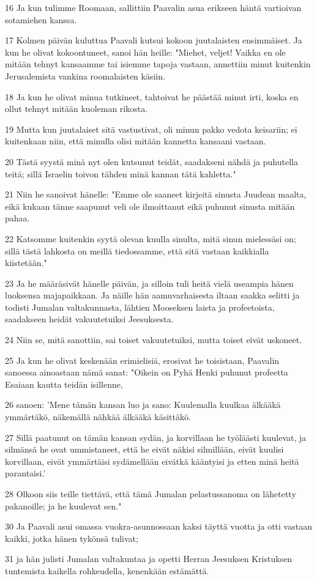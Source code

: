 \par 16 Ja kun tulimme Roomaan, sallittiin Paavalin asua erikseen häntä vartioivan sotamiehen kanssa.
\par 17 Kolmen päivän kuluttua Paavali kutsui kokoon juutalaisten ensimmäiset. Ja kun he olivat kokoontuneet, sanoi hän heille: "Miehet, veljet! Vaikka en ole mitään tehnyt kansaamme tai isiemme tapoja vastaan, annettiin minut kuitenkin Jerusalemista vankina roomalaisten käsiin.
\par 18 Ja kun he olivat minua tutkineet, tahtoivat he päästää minut irti, koska en ollut tehnyt mitään kuoleman rikosta.
\par 19 Mutta kun juutalaiset sitä vastustivat, oli minun pakko vedota keisariin; ei kuitenkaan niin, että minulla olisi mitään kannetta kansaani vastaan.
\par 20 Tästä syystä minä nyt olen kutsunut teidät, saadakseni nähdä ja puhutella teitä; sillä Israelin toivon tähden minä kannan tätä kahletta."
\par 21 Niin he sanoivat hänelle: "Emme ole saaneet kirjeitä sinusta Juudean maalta, eikä kukaan tänne saapunut veli ole ilmoittanut eikä puhunut sinusta mitään pahaa.
\par 22 Katsomme kuitenkin syytä olevan kuulla sinulta, mitä sinun mielessäsi on; sillä tästä lahkosta on meillä tiedossamme, että sitä vastaan kaikkialla kiistetään."
\par 23 Ja he määräsivät hänelle päivän, ja silloin tuli heitä vielä useampia hänen luoksensa majapaikkaan. Ja näille hän aamuvarhaisesta iltaan saakka selitti ja todisti Jumalan valtakunnasta, lähtien Mooseksen laista ja profeetoista, saadakseen heidät vakuutetuiksi Jeesuksesta.
\par 24 Niin se, mitä sanottiin, sai toiset vakuutetuiksi, mutta toiset eivät uskoneet.
\par 25 Ja kun he olivat keskenään erimielisiä, erosivat he toisistaan, Paavalin sanoessa ainoastaan nämä sanat: "Oikein on Pyhä Henki puhunut profeetta Esaiaan kautta teidän isillenne,
\par 26 sanoen: 'Mene tämän kansan luo ja sano: Kuulemalla kuulkaa älkääkä ymmärtäkö, näkemällä nähkää älkääkä käsittäkö.
\par 27 Sillä paatunut on tämän kansan sydän, ja korvillaan he työläästi kuulevat, ja silmänsä he ovat ummistaneet, että he eivät näkisi silmillään, eivät kuulisi korvillaan, eivät ymmärtäisi sydämellään eivätkä kääntyisi ja etten minä heitä parantaisi.'
\par 28 Olkoon siis teille tiettävä, että tämä Jumalan pelastussanoma on lähetetty pakanoille; ja he kuulevat sen."
\par 30 Ja Paavali asui omassa vuokra-asunnossaan kaksi täyttä vuotta ja otti vastaan kaikki, jotka hänen tykönsä tulivat;
\par 31 ja hän julisti Jumalan valtakuntaa ja opetti Herran Jeesuksen Kristuksen tuntemista kaikella rohkeudella, kenenkään estämättä.


